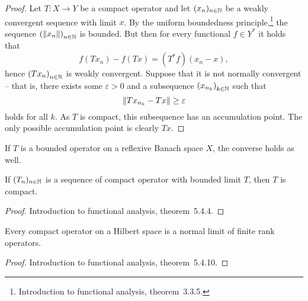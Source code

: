 \begin{proof}
Let $T \colon X \to Y$ be a compact operator and let
$(x_n)_{n \in \mathbb{N}}$ be a weakly convergent sequence with limit $x$.
By the uniform boundedness principle,\footnote{Introduction to
functional analysis, theorem~3.3.5.} the sequence
$\left(\left\lVert x_n\right\rVert\right)_{n \in \mathbb{N}}$ is bounded. But then for every
functional $f \in Y^*$ it holds that
\[
f(Tx_n) - f(Tx) = (T^* f)(x_n - x),
\]
hence $\left(Tx_n\right)_{n \in \mathbb{N}}$ is weakly convergent. Suppose that it
is not normally convergent -- that is, there exists some 
$\varepsilon > 0$ and a subsequence $\left(x_{n_k}\right)_{k \in \mathbb{N}}$ such
that
\[
\left\lVert Tx_{n_k} - Tx\right\rVert \geq \varepsilon
\]
holds for all $k$. As $T$ is compact, this subsequence has an
accumulation point. The only possible accumulation point is
clearly $Tx$.
\end{proof}

\begin{opomba}
If $T$ is a bounded operator on a reflexive Banach space $X$, the
converse holds as well.
\end{opomba}

\begin{izrek}
If $(T_n)_{n \in \mathbb{N}}$ is a sequence of compact operator with
bounded limit $T$, then $T$ is compact.
\end{izrek}

\begin{proof}
Introduction to functional analysis, theorem~5.4.4.
\end{proof}

\begin{izrek}
Every compact operator on a Hilbert space is a normal limit of
finite rank operators.
\end{izrek}

\begin{proof}
Introduction to functional analysis, theorem~5.4.10.
\end{proof}
